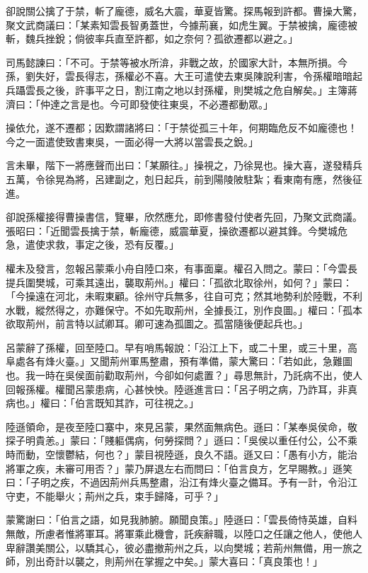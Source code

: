 卻說關公擒了于禁，斬了龐德，威名大震，華夏皆驚。探馬報到許都。曹操大驚，聚文武商議曰：「某素知雲長智勇蓋世，今據荊襄，如虎生翼。于禁被擒，龐德被斬，魏兵挫銳；倘彼率兵直至許都，如之奈何？孤欲遷都以避之。」

司馬懿諫曰：「不可。于禁等被水所渰，非戰之故，於國家大計，本無所損。今孫，劉失好，雲長得志，孫權必不喜。大王可遣使去東吳陳說利害，令孫權暗暗起兵躡雲長之後，許事平之日，割江南之地以封孫權，則樊城之危自解矣。」主簿蔣濟曰：「仲達之言是也。今可即發使往東吳，不必遷都動眾。」

操依允，遂不遷都；因歎謂諸將曰：「于禁從孤三十年，何期臨危反不如龐德也！今之一面遣使致書東吳，一面必得一大將以當雲長之銳。」

言未畢，階下一將應聲而出曰：「某願往。」操視之，乃徐晃也。操大喜，遂發精兵五萬，令徐晃為將，呂建副之，剋日起兵，前到陽陵陂駐紮；看東南有應，然後征進。

卻說孫權接得曹操書信，覽畢，欣然應允，即修書發付使者先回，乃聚文武商議。張昭曰：「近聞雲長擒于禁，斬龐德，威震華夏，操欲遷都以避其鋒。今樊城危急，遣使求救，事定之後，恐有反覆。」

權未及發言，忽報呂蒙乘小舟自陸口來，有事面稟。權召入問之。蒙曰：「今雲長提兵圍樊城，可乘其遠出，襲取荊州。」權曰：「孤欲北取徐州，如何？」蒙曰：「今操遠在河北，未暇東顧。徐州守兵無多，往自可克；然其地勢利於陸戰，不利水戰，縱然得之，亦難保守。不如先取荊州，全據長江，別作良圖。」權曰：「孤本欲取荊州，前言特以試卿耳。卿可速為孤圖之。孤當隨後便起兵也。」

呂蒙辭了孫權，回至陸口。早有哨馬報說：「沿江上下，或二十里，或三十里，高阜處各有烽火臺。」又聞荊州軍馬整肅，預有準備，蒙大驚曰：「若如此，急難圖也。我一時在吳侯面前勸取荊州，今卻如何處置？」尋思無計，乃託病不出，使人回報孫權。權聞呂蒙患病，心甚怏怏。陸遜進言曰：「呂子明之病，乃詐耳，非真病也。」權曰：「伯言既知其詐，可往視之。」

陸遜領命，是夜至陸口寨中，來見呂蒙，果然面無病色。遜曰：「某奉吳侯命，敬探子明貴恙。」蒙曰：「賤軀偶病，何勞探問？」遜曰：「吳侯以重任付公，公不乘時而動，空懷鬱結，何也？」蒙目視陸遜，良久不語。遜又曰：「愚有小方，能治將軍之疾，未審可用否？」蒙乃屏退左右而問曰：「伯言良方，乞早賜教。」遜笑曰：「子明之疾，不過因荊州兵馬整肅，沿江有烽火臺之備耳。予有一計，令沿江守吏，不能舉火；荊州之兵，束手歸降，可乎？」

蒙驚謝曰：「伯言之語，如見我肺腑。願聞良策。」陸遜曰：「雲長倚恃英雄，自料無敵，所慮者惟將軍耳。將軍乘此機會，託疾辭職，以陸口之任讓之他人，使他人卑辭讚美關公，以驕其心，彼必盡撤荊州之兵，以向樊城；若荊州無備，用一旅之師，別出奇計以襲之，則荊州在掌握之中矣。」蒙大喜曰：「真良策也！」

